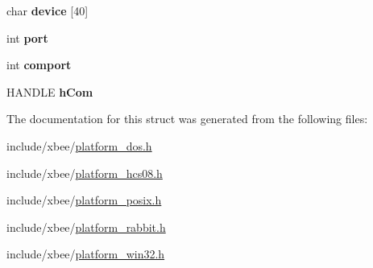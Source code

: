 \begin{DoxyCompactItemize}
\item 
\hypertarget{group__hal__posix_ga3a03f8d1b13de77b5c0885971a535d02}{char {\bfseries device} \mbox{[}40\mbox{]}}\label{group__hal__posix_ga3a03f8d1b13de77b5c0885971a535d02}

\item 
\hypertarget{structxbee__serial__t_a63c89c04d1feae07ca35558055155ffb}{int {\bfseries port}}\label{structxbee__serial__t_a63c89c04d1feae07ca35558055155ffb}

\item 
\hypertarget{group__hal__win32_ga7fe6807e4e54777ba00f6dc48294f891}{int {\bfseries comport}}\label{group__hal__win32_ga7fe6807e4e54777ba00f6dc48294f891}

\item 
\hypertarget{group__hal__win32_ga36ece86d4caa2125784ad17fe12c0e95}{H\-A\-N\-D\-L\-E {\bfseries h\-Com}}\label{group__hal__win32_ga36ece86d4caa2125784ad17fe12c0e95}

\end{DoxyCompactItemize}


The documentation for this struct was generated from the following files\-:\begin{DoxyCompactItemize}
\item 
include/xbee/\hyperlink{platform__dos_8h}{platform\-\_\-dos.\-h}\item 
include/xbee/\hyperlink{platform__hcs08_8h}{platform\-\_\-hcs08.\-h}\item 
include/xbee/\hyperlink{platform__posix_8h}{platform\-\_\-posix.\-h}\item 
include/xbee/\hyperlink{platform__rabbit_8h}{platform\-\_\-rabbit.\-h}\item 
include/xbee/\hyperlink{platform__win32_8h}{platform\-\_\-win32.\-h}\end{DoxyCompactItemize}
